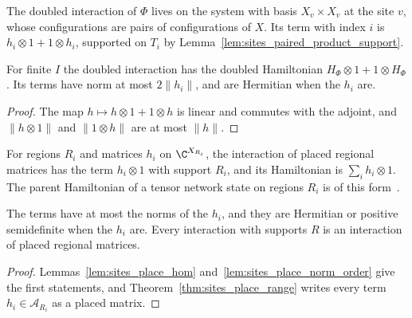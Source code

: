 \begin{definition}
    \label{def:dynamics_interaction_doubled}
    \leanok
    The doubled interaction of $\Phi$ lives on the system with basis $X_v\times X_v$ at
    the site $v$, whose configurations are pairs of configurations of $X$. Its term
    with index $i$ is $h_i\otimes1+1\otimes h_i$, supported on $T_i$ by
    Lemma~\ref{lem:sites_paired_product_support}.
\end{definition}

\begin{lemma}
    \label{lem:dynamics_interaction_doubled}
    \leanok
    For finite $I$ the doubled interaction has the doubled Hamiltonian
    $H_\Phi\otimes1+1\otimes H_\Phi$. Its terms have norm at most $2\lVert h_i\rVert$,
    and are Hermitian when the $h_i$ are.
\end{lemma}
\begin{proof}
    \leanok
    The map $h\mapsto h\otimes1+1\otimes h$ is linear and commutes with the adjoint, and
    $\lVert h\otimes1\rVert$ and $\lVert1\otimes h\rVert$ are at most $\lVert h\rVert$.
\end{proof}

\begin{definition}
    \label{def:dynamics_interaction_of_place}
    \leanok
    For regions $R_i$ and matrices $h_i$ on $\C^{X_{R_i}}$, the interaction of placed regional
    matrices has the term $h_i\otimes1$ with support $R_i$, and its Hamiltonian is
    $\sum_ih_i\otimes1$. The parent Hamiltonian of a tensor network state on regions $R_i$
    is of this form~\cite{Cirac2021Matrix}.
\end{definition}

\begin{lemma}
    \label{lem:dynamics_interaction_of_place}
    \leanok
    The terms have at most the norms of the $h_i$, and they are Hermitian or positive
    semidefinite when the $h_i$ are. Every interaction with supports $R$ is an interaction of
    placed regional matrices.
\end{lemma}
\begin{proof}\leanok
    Lemmas~\ref{lem:sites_place_hom} and~\ref{lem:sites_place_norm_order} give the first
    statements, and Theorem~\ref{thm:sites_place_range} writes every term $h_i\in
    \mathcal A_{R_i}$ as a placed matrix.
\end{proof}


